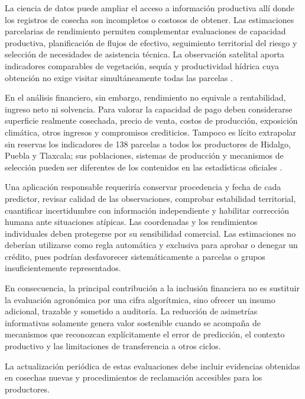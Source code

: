 La ciencia de datos puede ampliar el acceso a información productiva allí donde los registros de cosecha son incompletos o costosos de obtener. Las estimaciones parcelarias de rendimiento permiten complementar evaluaciones de capacidad productiva, planificación de flujos de efectivo, seguimiento territorial del riesgo y selección de necesidades de asistencia técnica. La observación satelital aporta indicadores comparables de vegetación, sequía y productividad hídrica cuya obtención no exige visitar simultáneamente todas las parcelas \parencite{Bokusheva2016,Dhonthi2024,FAOWaPOR,Serban2025}.

En el análisis financiero, sin embargo, rendimiento no equivale a rentabilidad, ingreso neto ni solvencia. Para valorar la capacidad de pago deben considerarse superficie realmente cosechada, precio de venta, costos de producción, exposición climática, otros ingresos y compromisos crediticios. Tampoco es lícito extrapolar sin reservas los indicadores de 138 parcelas a todos los productores de Hidalgo, Puebla y Tlaxcala; sus poblaciones, sistemas de producción y mecanismos de selección pueden ser diferentes de los contenidos en las estadísticas oficiales \parencite{FIRA2026AgroCebada,SIAPDatos}.

Una aplicación responsable requeriría conservar procedencia y fecha de cada predictor, revisar calidad de las observaciones, comprobar estabilidad territorial, cuantificar incertidumbre con información independiente y habilitar corrección humana ante situaciones atípicas. Las coordenadas y los rendimientos individuales deben protegerse por su sensibilidad comercial. Las estimaciones no deberían utilizarse como regla automática y exclusiva para aprobar o denegar un crédito, pues podrían desfavorecer sistemáticamente a parcelas o grupos insuficientemente representados.

En consecuencia, la principal contribución a la inclusión financiera no es sustituir la evaluación agronómica por una cifra algorítmica, sino ofrecer un insumo adicional, trazable y sometido a auditoría. La reducción de asimetrías informativas solamente genera valor sostenible cuando se acompaña de mecanismos que reconozcan explícitamente el error de predicción, el contexto productivo y las limitaciones de transferencia a otros ciclos.

La actualización periódica de estas evaluaciones debe incluir evidencias obtenidas en cosechas nuevas y procedimientos de reclamación accesibles para los productores.
